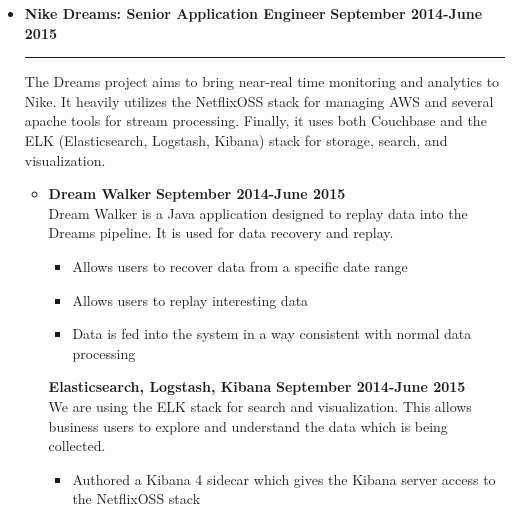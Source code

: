 \documentclass[overlapped]{res}
\begin{document}
\begin{resume}
\begin{itemize}[leftmargin=0in]
    \item[] 
        \textbf{Nike Dreams: Senior Application Engineer} \hfill \textbf{September 2014-June 2015} \\[-0.1in] \rule{\textwidth}{0.5pt}
        The Dreams project aims to bring near-real time monitoring and analytics to Nike. It heavily utilizes the NetflixOSS stack for managing
        AWS and several apache tools for stream processing. Finally, it uses both Couchbase and the ELK (Elasticsearch, Logstash, Kibana) 
        stack for storage, search, and visualization.
        \vspace{0.125in}
        \begin{itemize}[leftmargin=0in]
            \item[] 
                \begin{samepage}
                    \textbf{Dream Walker} \hfill \textbf{September 2014-June 2015} \\
                    Dream Walker is a Java application designed to replay data into the Dreams pipeline. It is used for
                    data recovery and replay.
                    \begin{itemize}
                        \item[\textbullet] Allows users to recover data from a specific date range
                        \item[\textbullet] Allows users to replay interesting data
                        \item[\textbullet] Data is fed into the system in a way consistent with normal data processing
                    \end{itemize}
                \end{samepage}
                \begin{samepage}
                    \textbf{Elasticsearch, Logstash, Kibana} \hfill \textbf{September 2014-June 2015} \\
                    We are using the ELK stack for search and visualization. This allows business users to explore and understand the data which is being collected.
                    \begin{itemize}
                        \item[\textbullet] Authored a Kibana 4 sidecar which gives the Kibana server access to the NetflixOSS stack

\end{itemize}
\end{samepage}
\end{itemize}
\end{itemize}
\end{resume}
\end{document}
